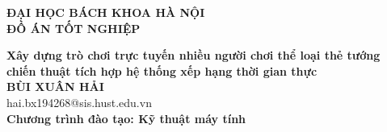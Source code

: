 \documentclass[Project.tex]{subfiles}
\begin{document}
\begin{titlepage}
\thispagestyle{empty}
\begin{center}

{\textbf{\large{ĐẠI HỌC BÁCH KHOA HÀ NỘI}}}\\[2.5cm]

{\textbf{\huge{ ĐỒ ÁN TỐT NGHIỆP}}}\\[0.8cm]
{\textbf{\Large{Xây dựng trò chơi trực tuyến nhiều người chơi thể loại thẻ tướng chiến thuật tích hợp hệ thống xếp hạng thời gian thực}}\\[0.8cm]

{\textbf{\large{BÙI XUÂN HẢI}}}\\
{\large{hai.bx194268@sis.hust.edu.vn}}\\[0.5cm]

{\textbf{\large{Chương trình đào tạo: Kỹ thuật máy tính
}}}\\

\vspace{2.5cm}
\begin{table}[H]
\centering
{}
\end{table}}
\end{center}



\end{titlepage}
\end{document}
